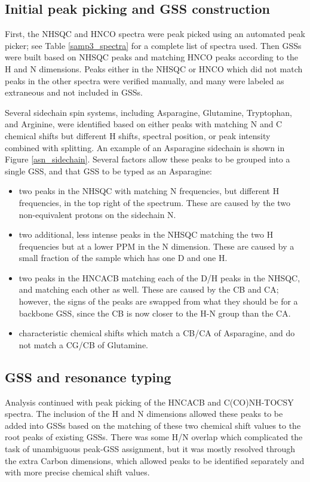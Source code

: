 \subsection*{Initial peak picking and GSS construction}
First, the NHSQC and HNCO spectra were peak picked using an automated 
peak picker; see Table \ref{samp3_spectra} for a complete list of spectra
used.  Then GSSs were built based on NHSQC peaks and matching HNCO peaks
according to the H and N dimensions.  Peaks either in the NHSQC or HNCO
which did not match peaks in the other spectra were verified manually, and
many were labeled as extraneous and not included in GSSs.

Several sidechain spin systems, including Asparagine, Glutamine, Tryptophan,
and Arginine, were identified based on either peaks with matching N and C
chemical shifts but different H shifts, spectral position, or peak intensity
combined with splitting.  An example of an Asparagine sidechain is shown in
Figure \ref{asn_sidechain}.  Several factors allow these peaks to be grouped
into a single GSS, and that GSS to be typed as an Asparagine:
\begin{itemize}
  \item two peaks in the NHSQC with matching N frequencies, but different H
    frequencies, in the top right of the spectrum.  These are caused by the
    two non-equivalent protons on the sidechain N.
  \item two additional, less intense peaks in the NHSQC matching the two
    H frequencies but at a lower PPM in the N dimension.  These are caused by
    a small fraction of the sample which has one D and one H.
  \item two peaks in the HNCACB matching each of the D/H peaks in the NHSQC,
    and matching each other as well.  These are caused by the CB and CA; 
    however, the signs of the peaks are swapped from what they should be for
    a backbone GSS, since the CB is now closer to the H-N group than the CA.
  \item characteristic chemical shifts which match a CB/CA of Asparagine, 
    and do not match a CG/CB of Glutamine.
\end{itemize}

\subsection*{GSS and resonance typing}
Analysis continued with peak picking of the HNCACB and C(CO)NH-TOCSY spectra.
The inclusion of the H and N dimensions allowed these peaks to be added into
GSSs based on the matching of these two chemical shift values to the
root peaks of existing GSSs.  There was some H/N overlap which complicated the
task of unambiguous peak-GSS assignment, but it was mostly resolved through
the extra Carbon dimensions, which allowed peaks to be identified separately
and with more precise chemical shift values.


